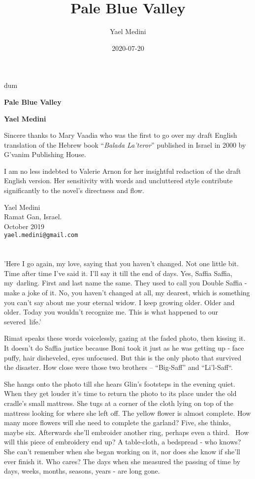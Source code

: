 \documentclass[twoside,11pt]{book}
\title{Pale Blue Valley}
\author{Yael Medini}
\date{2020-07-20}
\begin{document}
\thispagestyle{empty}
{\nullfont dum}
\vspace{.3\textheight}
\begin{center}
{\Huge \textbf{Pale Blue Valley}}

\bigskip

\textbf{\Large Yael Medini}
\end{center}
\vspace{.2\textheight}

Sincere thanks to Mary Vaadia who was the first to go over my draft
English translation of the Hebrew book ``\emph{Balada La'teror}''
published in Israel in 2000 by G'vanim Publishing House.

\bigskip 
I am no less indebted to Valerie Arnon for her insightful redaction of the
draft English version. Her sensitivity with words and uncluttered style
contribute significantly to the novel's directness and flow.

\bigskip
{
\parindent=0pt
Yael Medini\\
Ramat Gan, Israel. \\
October 2019 \\
\texttt{yael.medini@gmail.com}
}


\chapter{}

'Here I go again, my love, saying that you haven't changed. Not one
little bit. Time after time I've said it. I'll say it till the end of
days. Yes, Saffia Saffia, my~darling. First and last name the
same. They used to call you Double Saffia - make a joke of it. No, you
haven't changed at all, my dearest, which is something you can't say
about me your eternal widow. I keep growing older. Older and older.
Today you wouldn't recognize me. This is what happened to our
severed~life.'

Rimat speaks these words voicelessly, gazing at the faded photo, then kissing it.
It doesn't do Saffia
justice because Boni took it just as he was getting up - face
puffy, hair disheveled,
eyes unfocused. But this is the only photo that survived the
disaster. How close were those two brothers -- ``Big-Saff'' and
``Li'l-Saff``.

She hangs onto the photo till she hears Glin's footsteps in the
evening quiet. When they get louder it's time to return the photo to
its place under the old cradle's small mattress. She tugs at a
corner of the cloth lying on top of the
mattress looking for where she left off. The yellow flower is almost
complete. How many more flowers will she need to complete the
garland? Five, she thinks, maybe six. Afterwards she'll embroider
another ring, perhaps even a third.~
How will this piece of embroidery end
up? 
A table-cloth, a bedspread - who knows? She can't remember when she
began working on it, nor does she know if she'll ever finish it. Who
cares? The days when she measured the passing of time by days, weeks, months, seasons, years - are long gone.
\end{document}
